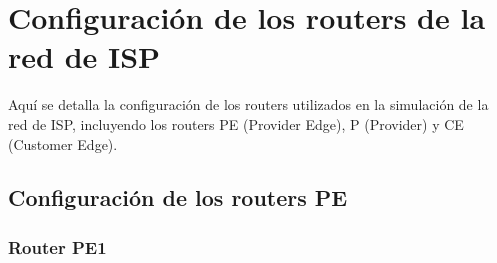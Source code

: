 \section{Configuración de los routers de la red de ISP}
Aquí se detalla la configuración de los routers utilizados en la simulación de la red de ISP, incluyendo los routers PE (Provider Edge), P (Provider) y CE (Customer Edge). 
\subsection{Configuración de los routers PE}
\label{Apendice2:configuracion_routers_pe}

\subsubsection*{Router PE1}
